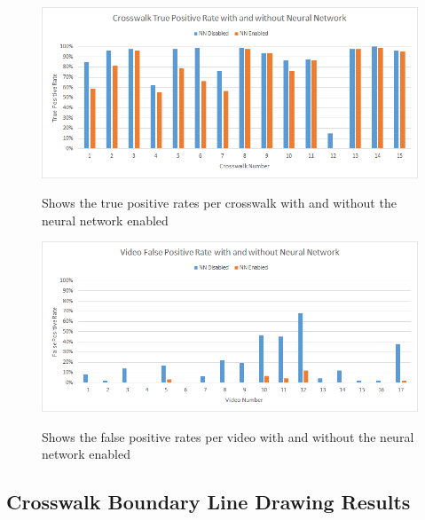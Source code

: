 \documentclass[12pt]{ucthesis}
\newcommand{\captionfonts}{\small\bf\ssp}
\begin{document}
\begin{figure}[t]
\begin{center}
\includegraphics[width=14cm]{CrosswalkTruePosWithAndWithout.png}
\captionfonts
\caption[Crosswalk True Positive Rate with and without Neural Network]{Shows the true positive rates per crosswalk with and without the neural network enabled}
\label{fig:CrosswalkTruePosWithAndWithout}
\end{center}
\end{figure}

\begin{figure}[t]
\begin{center}
\includegraphics[width=14cm]{VideoFalsePosWithAndWithout.png}
\captionfonts
\caption[Video False Positive Rate with and without Neural Network]{Shows the false positive rates per video with and without the neural network enabled}
\label{fig:VideoFalsePosWithAndWithout}
\end{center}
\end{figure}

\subsection{Crosswalk Boundary Line Drawing Results}
\end{document}
